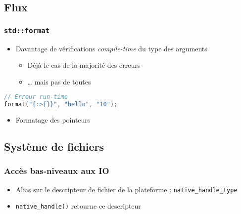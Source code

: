 \documentclass[C++.tex]{subfiles}
\begin{document}
\subsection*{Flux}
\begin{frame}[fragile]
	\frametitle{\lstinline|std::format|}
	\begin{itemize}
		\item Davantage de vérifications \textit{compile-time} du type des arguments
		\begin{itemize}
			\item Déjà le cas de la majorité des erreurs
			\item \ldots{} mais pas de toutes
		\end{itemize}
	\end{itemize}

	\begin{lstlisting}[language=C++]
// Erreur run-time
format("{:>{}}", "hello", "10");\end{lstlisting}

	\begin{itemize}
		\item Formatage des pointeurs
	\end{itemize}
\end{frame}

\subsection*{Système de fichiers}
\begin{frame}[fragile]
	\frametitle{Accès bas-niveaux aux IO}
	\begin{itemize}
		\item Alias sur le descripteur de fichier de la plateforme : \lstinline|native_handle_type|
		
		 
		\item \lstinline|native_handle()| retourne ce descripteur
	\end{itemize}
\end{frame}
\end{document}
